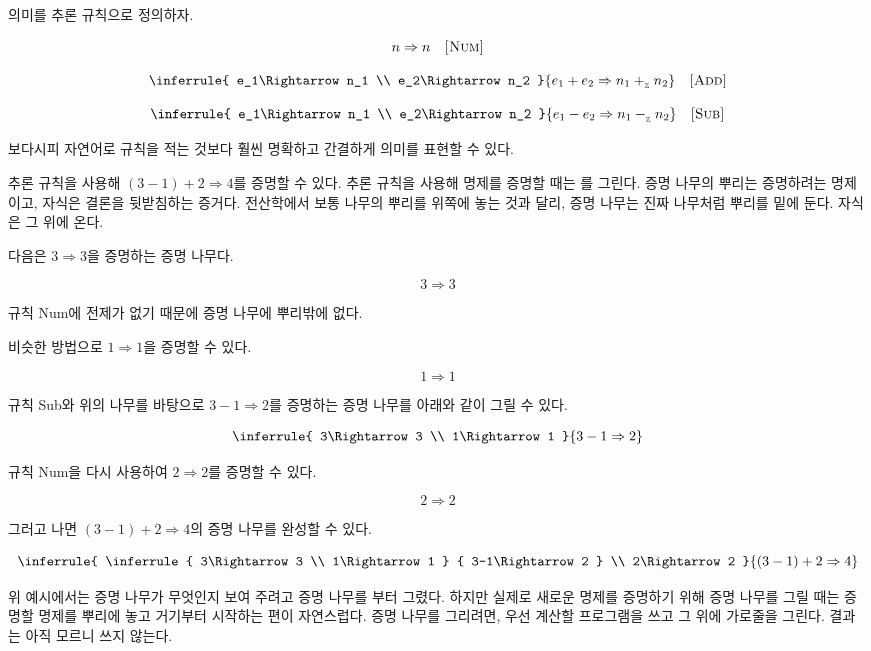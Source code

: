  의미를 추론 규칙으로 정의하자.

\[
  n\Rightarrow n
  \quad\textsc{[Num]}
\]

\[
  \inferrule
  { e_1\Rightarrow n_1 \\ e_2\Rightarrow n_2 }
  { e_1+e_2\Rightarrow n_1\iadd n_2 }
  \quad\textsc{[Add]}
\]

\[
  \inferrule
  { e_1\Rightarrow n_1 \\ e_2\Rightarrow n_2 }
  { e_1-e_2\Rightarrow n_1\isub n_2 }
  \quad\textsc{[Sub]}
\]

보다시피 자연어로 규칙을 적는 것보다 훨씬 명확하고 간결하게 의미를 표현할 수
있다.

추론 규칙을 사용해 $(3-1)+2\Rightarrow4$를 증명할 수 있다. 추론 규칙을 사용해
명제를 증명할 때는 를 그린다. 증명 나무의 뿌리는
증명하려는 명제이고, 자식은 결론을 뒷받침하는 증거다. 전산학에서 보통 나무의
뿌리를 위쪽에 놓는 것과 달리, 증명 나무는 진짜 나무처럼 뿌리를 밑에 둔다. 자식은
그 위에 온다.

다음은 $3\Rightarrow 3$을 증명하는 증명 나무다.

\[3\Rightarrow3\]

규칙 Num에 전제가 없기 때문에 증명 나무에 뿌리밖에 없다.

비슷한 방법으로 $1\Rightarrow 1$을 증명할 수 있다.

\[1\Rightarrow1\]

규칙 Sub와 위의 나무를 바탕으로 $3-1\Rightarrow2$를 증명하는 증명 나무를 아래와
같이 그릴 수 있다.

\[
  \inferrule
  { 3\Rightarrow3 \\ 1\Rightarrow1 }
  { 3-1\Rightarrow2 }
\]

규칙 Num을 다시 사용하여 $2\Rightarrow2$를 증명할 수 있다.

\[2\Rightarrow2\]

그러고 나면 $(3-1)+2\Rightarrow4$의 증명 나무를 완성할 수 있다.

\[
  \inferrule
  {
    \inferrule
    { 3\Rightarrow3 \\ 1\Rightarrow1 }
    { 3-1\Rightarrow2 }
    \\
    2\Rightarrow2
  }
  { (3-1)+2\Rightarrow4 }
\]

위 예시에서는 증명 나무가 무엇인지 보여 주려고 증명 나무를 부터
그렸다. 하지만 실제로 새로운 명제를 증명하기 위해 증명 나무를 그릴 때는 증명할
명제를 뿌리에 놓고 거기부터 시작하는 편이 자연스럽다. 증명 나무를 그리려면, 우선
계산할 프로그램을 쓰고 그 위에 가로줄을 그린다. 결과는 아직 모르니 쓰지 않는다.

